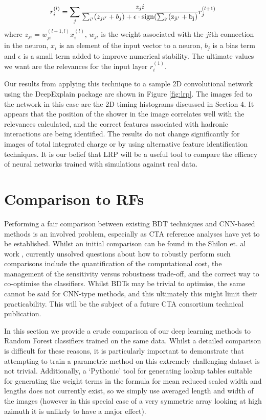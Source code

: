 \begin{equation}
r^{(l)}_i=\sum_j\frac{z_ji}{\sum_{i'}(z_{ji'}+b_j)+\epsilon\cdot\rm{sign}(\sum_{i'}(z_{ji'}+b_j)}r_j^{(l+1)}
\end{equation}
where $z_{ji}=w_{ji}^{(l+1,l)}x_i^{(l)}$, $w_{ji}$ is the weight associated with the $ji$th connection in the neuron, $x_i$ is an element of the input vector to a neuron, $b_j$ is a bias term and $\epsilon$ is a small term added to improve numerical stability. The ultimate values we want are the relevances for the input layer $r_i^{(1)}$.

Our results from applying this technique to a sample 2D convolutional network using the DeepExplain package are shown in Figure \ref{fig:lrp}. The images fed to the network in this case are the 2D timing histograms discussed in Section 4. It appears that the position of the shower in the image correlates well with the relevances calculated, and the correct features associated with hadronic interactions are being identified. The results do not change significantly for images of total integrated charge or by using alternative feature identification techniques. It is our belief that LRP will be a useful tool to compare the efficacy of neural networks trained with simulations against real data.

\section{Comparison to RFs}

Performing a fair comparison between existing BDT techniques and CNN-based methods is an involved problem, especially as CTA reference analyses have yet to be established. Whilst an initial comparison can be found in the Shilon et. al work \cite{Shilon}, currently unsolved questions about how to robustly perform such comparisons include the quantification of the computational cost, the management of the sensitivity versus robustness trade-off, and the correct way to co-optimise the classifiers. Whilst BDTs may be trivial to optimise, the same cannot be said for CNN-type methods, and this ultimately this might limit their practicability. This will be the subject of a future CTA consortium technical publication.

In this section we provide a crude comparison of our deep learning methods to Random Forest classifiers trained on the same data. Whilst a detailed comparison is difficult for these reasons, it is particularly important to demonstrate that attempting to train a parametric method on this extremely challenging dataset is not trivial. Additionally, a `Pythonic' tool for generating lookup tables suitable for generating the weight terms in the formula for mean reduced scaled width and lengths does not currently exist, so we simply use averaged length and width of the images (however in this special case of a very symmetric array looking at high azimuth it is unlikely to have a major effect).

